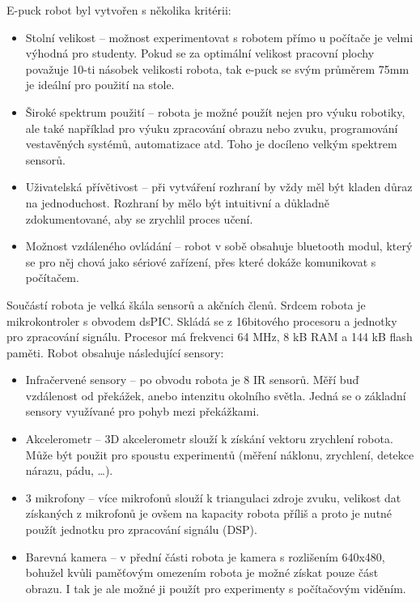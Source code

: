 \documentclass[12pt,notitlepage]{report}
\begin{document}
    E-puck robot byl vytvořen s několika kritérii\cite{bonani}:
    \begin{itemize}
        \item Stolní velikost -- možnost experimentovat s robotem přímo u
        počítače je velmi výhodná pro studenty. Pokud se za optimální velikost
        pracovní plochy považuje 10-ti násobek velikosti robota, tak e-puck se
        svým průměrem 75mm je ideální pro použití na stole.

        \item Široké spektrum použití -- robota je možné použít nejen pro výuku
        robotiky, ale také například pro výuku zpracování obrazu nebo zvuku,
        programování vestavěných systémů, automatizace atd. Toho je docíleno
        velkým spektrem sensorů.

        \item Uživatelská přívětivost -- při vytváření rozhraní by vždy měl být
        kladen důraz na jednoduchost. Rozhraní by mělo být intuitivní a
        důkladně zdokumentované, aby se zrychlil proces učení.

        \item Možnost vzdáleného ovládání -- robot v sobě obsahuje bluetooth
        modul, který se pro něj chová jako sériové zařízení, přes které dokáže
        komunikovat s počítačem.
    \end{itemize}

    Součástí robota je velká škála sensorů a akčních členů. Srdcem robota je
    mikrokontroler s obvodem dsPIC. Skládá se z 16bitového procesoru a jednotky
    pro zpracování signálu. Procesor má frekvenci 64 MHz, 8 kB RAM a 144 kB
    flash paměti. Robot obsahuje následující sensory:

    \begin{itemize}
        \item Infračervené sensory -- po obvodu robota je 8 IR sensorů. Měří
        buď vzdálenost od překážek, anebo intenzitu okolního světla. Jedná se o
        základní sensory využívané pro pohyb mezi překážkami.

        \item Akcelerometr -- 3D akcelerometr slouží k získání vektoru
        zrychlení robota. Může být použit pro spoustu experimentů (měření
        náklonu, zrychlení, detekce nárazu, pádu, \ldots).

        \item 3 mikrofony -- více mikrofonů slouží k triangulaci zdroje zvuku,
        velikost dat získaných z mikrofonů je ovšem na kapacity robota příliš a
        proto je nutné použít jednotku pro zpracování signálu (DSP).

        \item Barevná kamera -- v přední části robota je kamera s rozlišením
        640x480, bohužel kvůli paměťovým omezením robota je možné získat pouze
        část obrazu. I tak je ale možné ji použít pro experimenty s počítačovým
        viděním.
    \end{itemize}
\end{document}
